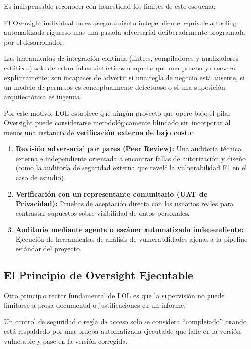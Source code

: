 \documentclass[14pt,a4paper,oneside]{extbook}
\begin{document}
Es indispensable reconocer con honestidad los límites de este esquema:
\begin{authorobservation}
El Oversight individual no es aseguramiento independiente; equivale a tooling automatizado riguroso más una pasada adversarial deliberadamente programada por el desarrollador.
\end{authorobservation}

Las herramientas de integración continua (linters, compiladores y analizadores estáticos) solo detectan fallos sintácticos o aquello que una prueba ya asevera explícitamente; son incapaces de advertir si una regla de negocio está ausente, si un modelo de permisos es conceptualmente defectuoso o si una suposición arquitectónica es ingenua.

Por este motivo, LOL establece que ningún proyecto que opere bajo el pilar Oversight puede considerarse metodológicamente blindado sin incorporar al menos una instancia de \textbf{verificación externa de bajo costo}:
\begin{enumerate}
\item \textbf{Revisión adversarial por pares (Peer Review):} Una auditoría técnica externa e independiente orientada a encontrar fallas de autorización y diseño (como la auditoría de seguridad externa que reveló la vulnerabilidad F1 en el caso de estudio).
\item \textbf{Verificación con un representante comunitario (UAT de Privacidad):} Pruebas de aceptación directa con los usuarios reales para contrastar supuestos sobre visibilidad de datos personales.
\item \textbf{Auditoría mediante agente o escáner automatizado independiente:} Ejecución de herramientas de análisis de vulnerabilidades ajenas a la pipeline estándar del proyecto.
\end{enumerate}

\subsection{El Principio de Oversight Ejecutable}

Otro principio rector fundamental de LOL es que la supervisión no puede limitarse a prosa documental o justificaciones en un informe:
\begin{authorobservation}
Un control de seguridad o regla de acceso solo se considera \enquote{completado} cuando está respaldado por una prueba automatizada ejecutable que falle en la versión vulnerable y pase en la versión corregida.
\end{authorobservation}
\end{document}
